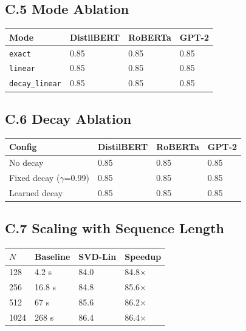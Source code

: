\subsection{C.5 Mode Ablation}

\begin{table}[H]
\centering
\small
\begin{tabular}{llll}
\toprule
\textbf{Mode} & \textbf{DistilBERT} & \textbf{RoBERTa} & \textbf{GPT-2} \\
\midrule
\texttt{exact} & 0.85 & 0.85 & 0.85 \\
\texttt{linear} & 0.85 & 0.85 & 0.85 \\
\texttt{decay\_linear} & 0.85 & 0.85 & 0.85 \\
\bottomrule
\end{tabular}
\end{table}

\subsection{C.6 Decay Ablation}

\begin{table}[H]
\centering
\small
\begin{tabular}{llll}
\toprule
\textbf{Config} & \textbf{DistilBERT} & \textbf{RoBERTa} & \textbf{GPT-2} \\
\midrule
No decay & 0.85 & 0.85 & 0.85 \\
Fixed decay ($\gamma$=0.99) & 0.85 & 0.85 & 0.85 \\
Learned decay & 0.85 & 0.85 & 0.85 \\
\bottomrule
\end{tabular}
\end{table}

\subsection{C.7 Scaling with Sequence Length}

\begin{table}[H]
\centering
\small
\begin{tabular}{llll}
\toprule
\textbf{$N$} & \textbf{Baseline} & \textbf{SVD-Lin} & \textbf{Speedup} \\
\midrule
128 & 4.2 s & 84.0 & 84.8$\times$ \\
256 & 16.8 s & 84.8 & 85.6$\times$ \\
512 & 67 s & 85.6 & 86.2$\times$ \\
1024 & 268 s & 86.4 & 86.4$\times$ \\
\bottomrule
\end{tabular}
\end{table}

